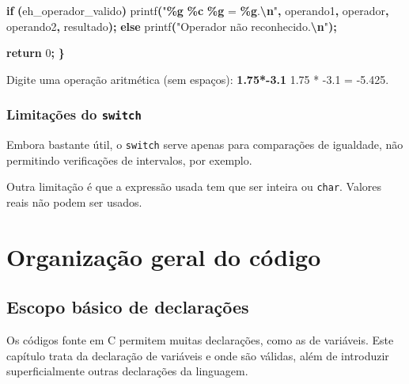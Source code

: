 \documentclass[
  11pt,
  a4paper,
]{scrbook}
\newenvironment{Shaded}{\begin{snugshade}}{\end{snugshade}}
\newcommand{\ControlFlowTok}[1]{\textcolor[rgb]{0.13,0.29,0.53}{\textbf{#1}}}
\newcommand{\DecValTok}[1]{\textcolor[rgb]{0.00,0.00,0.81}{#1}}
\newcommand{\KeywordTok}[1]{\textcolor[rgb]{0.13,0.29,0.53}{\textbf{#1}}}
\newcommand{\NormalTok}[1]{#1}
\newcommand{\OperatorTok}[1]{\textcolor[rgb]{0.81,0.36,0.00}{\textbf{#1}}}
\newcommand{\SpecialCharTok}[1]{\textcolor[rgb]{0.81,0.36,0.00}{\textbf{#1}}}
\newcommand{\StringTok}[1]{\textcolor[rgb]{0.31,0.60,0.02}{#1}}
\begin{document}
\begin{Shaded}
\begin{Highlighting}[]
    \ControlFlowTok{if} \OperatorTok{(}\NormalTok{eh\_operador\_valido}\OperatorTok{)}
\NormalTok{        printf}\OperatorTok{(}\StringTok{"}\SpecialCharTok{\%g}\StringTok{ }\SpecialCharTok{\%c}\StringTok{ }\SpecialCharTok{\%g}\StringTok{ = }\SpecialCharTok{\%g}\StringTok{.}\SpecialCharTok{\textbackslash{}n}\StringTok{"}\OperatorTok{,}\NormalTok{ operando1}\OperatorTok{,}\NormalTok{ operador}\OperatorTok{,}\NormalTok{ operando2}\OperatorTok{,}\NormalTok{ resultado}\OperatorTok{);}
    \ControlFlowTok{else}
\NormalTok{        printf}\OperatorTok{(}\StringTok{"Operador não reconhecido.}\SpecialCharTok{\textbackslash{}n}\StringTok{"}\OperatorTok{);}

    \ControlFlowTok{return} \DecValTok{0}\OperatorTok{;}
\OperatorTok{\}}
\end{Highlighting}
\end{Shaded}

\begin{Shaded}
\begin{Highlighting}[]
\NormalTok{Digite uma operação aritmética (sem espaços): }\KeywordTok{ 1.75*{-}3.1 }
\NormalTok{1.75 * {-}3.1 = {-}5.425.}
\end{Highlighting}
\end{Shaded}

\section{\texorpdfstring{Limitações do
\texttt{switch}}{Limitações do switch}}\label{limitauxe7uxf5es-do-switch}

Embora bastante útil, o \texttt{switch} serve apenas para comparações de
igualdade, não permitindo verificações de intervalos, por exemplo.

Outra limitação é que a expressão usada tem que ser inteira ou
\texttt{char}. Valores reais não podem ser usados.

\part{Organização geral do código}

\chapter{Escopo básico de
declarações}\label{escopo-buxe1sico-de-declarauxe7uxf5es}

Os códigos fonte em C permitem muitas declarações, como as de variáveis.
Este capítulo trata da declaração de variáveis e onde são válidas, além
de introduzir superficialmente outras declarações da linguagem.
\end{document}
